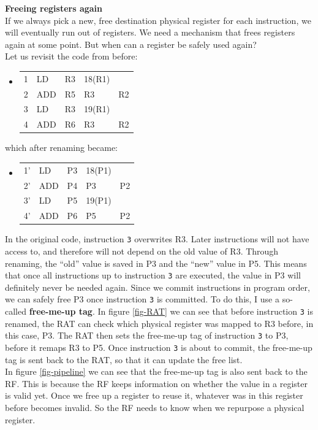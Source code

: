 \documentclass[12pt,a4paper]{article} %
\newenvironment {assembly}{\begingroup \ttfamily \color{Gray} \begin{itemize} \item[]}{\end{itemize}\endgroup}
\begin{document}
\newpage
\textbf{Freeing registers again}\\
If we always pick a new, free destination physical register for each instruction, we will eventually run out of registers. We need a mechanism that frees registers again at some point. But when can a register be safely used again?\\
Let us revisit the code from before:
\begin{assembly}
	\begin{tabularx} {\textwidth} {n o a a X}
		1 & LD  & R3 & 18(R1)	& \\
		2 & ADD & R5 & R3		& R2\\
		3 & LD  & R3 & 19(R1)	& \\
		4 & ADD & R6 & R3		& R2
	\end{tabularx}%
\end{assembly}%
which after renaming became:
\begin{assembly}
	\begin{tabularx} {\textwidth} {n o a a X}
		1' & LD & P3 & 18(P1)	& \\
		2' & ADD & P4 & P3		& P2\\
		3' & LD & P5 & 19(P1)	& \\
		4' & ADD & P6 & P5		& P2
	\end{tabularx}%
\end{assembly}%
In the original code, instruction \texttt{3} overwrites R3. Later instructions will not have access to, and therefore will not depend on the old value of R3. Through renaming, the ``old'' value is saved in P3 and the ``new'' value in P5. This means that once all instructions up to instruction \texttt{3} are executed, the value in P3 will definitely never be needed again. Since we commit instructions in program order, we can safely free P3 once instruction \texttt{3} is committed. To do this, I use a so-called \textbf{free-me-up tag}. In figure \ref{fig-RAT} we can see that before instruction \texttt{3} is renamed, the RAT can check which physical register was mapped to R3 before, in this case, P3. The RAT then sets the free-me-up tag of instruction \texttt{3} to P3, before it remaps R3 to P5. Once instruction \texttt{3} is about to commit, the free-me-up tag is sent back to the RAT, so that it can update the free list.\\

In figure \ref{fig-pipeline} we can see that the free-me-up tag is also sent back to the RF. This is because the RF keeps information on whether the value in a register is valid yet. Once we free up a register to reuse it, whatever was in this register before becomes invalid. So the RF needs to know when we repurpose a physical register.\\
\end{document}
